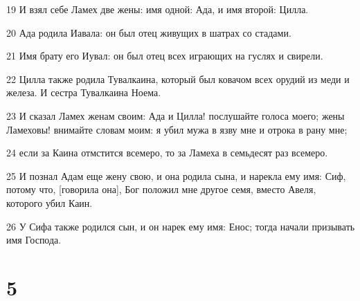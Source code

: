 \par 19 И взял себе Ламех две жены: имя одной: Ада, и имя второй: Цилла.
\par 20 Ада родила Иавала: он был отец живущих в шатрах со стадами.
\par 21 Имя брату его Иувал: он был отец всех играющих на гуслях и свирели.
\par 22 Цилла также родила Тувалкаина, который был ковачом всех орудий из меди и железа. И сестра Тувалкаина Ноема.
\par 23 И сказал Ламех женам своим: Ада и Цилла! послушайте голоса моего; жены Ламеховы! внимайте словам моим: я убил мужа в язву мне и отрока в рану мне;
\par 24 если за Каина отмстится всемеро, то за Ламеха в семьдесят раз всемеро.
\par 25 И познал Адам еще жену свою, и она родила сына, и нарекла ему имя: Сиф, потому что, [говорила она], Бог положил мне другое семя, вместо Авеля, которого убил Каин.
\par 26 У Сифа также родился сын, и он нарек ему имя: Енос; тогда начали призывать имя Господа.

\chapter{5}

